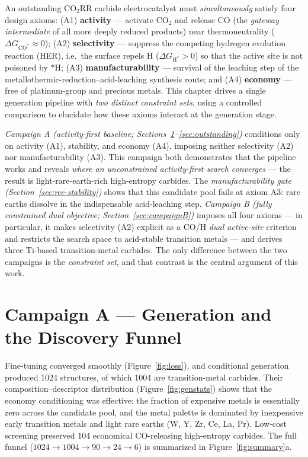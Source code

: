 \documentclass[11pt,a4paper]{report}
\newcommand{\dGCO}{\Delta G_{\mathrm{CO^*}}}
\newcommand{\dGH}{\Delta G_{\mathrm{H^*}}}
\begin{document}
\noindent An outstanding CO$_2$RR carbide electrocatalyst must \emph{simultaneously} satisfy four design axioms:
(A1) \textbf{activity} --- activate CO$_2$ and release CO (the \emph{gateway intermediate} of all more deeply reduced products) near thermoneutrality ($\dGCO\!\approx\!0$); (A2)
\textbf{selectivity} --- suppress the competing hydrogen evolution reaction (HER), i.e.\ the surface repels H ($\dGH>0$) so that the active site is not
poisoned by $*$H; (A3) \textbf{manufacturability} --- survival of the leaching step of the metallothermic-reduction--acid-leaching synthesis route; and
(A4) \textbf{economy} --- free of platinum-group and precious metals. This chapter drives a single generation pipeline with \emph{two
distinct constraint sets}, using a controlled comparison to elucidate how these axioms interact at the generation stage.

\emph{Campaign A (activity-first baseline; Sections~\ref{sec:funnelA}--\ref{sec:outstanding})} conditions only on activity (A1), stability, and economy (A4), imposing neither selectivity (A2) nor manufacturability (A3). This campaign both demonstrates that the pipeline works and reveals \emph{where an unconstrained activity-first search converges} --- the result is light-rare-earth-rich
high-entropy carbides. The \emph{manufacturability gate (Section~\ref{sec:ree-stability})} shows that this candidate pool fails at axiom A3: rare earths dissolve in the indispensable acid-leaching step. \emph{Campaign B (fully constrained dual objective;
Section~\ref{sec:campaignB})} imposes all four axioms --- in particular, it makes selectivity (A2) explicit as a CO/H \emph{dual active-site}
criterion and restricts the search space to acid-stable transition metals --- and derives three Ti-based transition-metal carbides.
The only difference between the two campaigns is the \emph{constraint set}, and that contrast is the central argument of this work.

\section{Campaign A --- Generation and the Discovery Funnel}
\label{sec:funnelA}
Fine-tuning converged smoothly (Figure~\ref{fig:loss}), and conditional generation produced 1024 structures, of which
1004 are transition-metal carbides. Their composition--descriptor distribution (Figure~\ref{fig:genstats}) shows that the economy
conditioning was effective: the fraction of expensive metals is essentially zero across the candidate pool, and the metal palette is
dominated by inexpensive early transition metals and light rare earths (W, Y, Zr, Ce, La, Pr). Low-cost screening preserved 104 economical
CO-releasing high-entropy carbides. The full funnel ($1024 \rightarrow 1004 \rightarrow 90
\rightarrow 24 \rightarrow 6$) is summarized in Figure~\ref{fig:summary}a.
\end{document}
